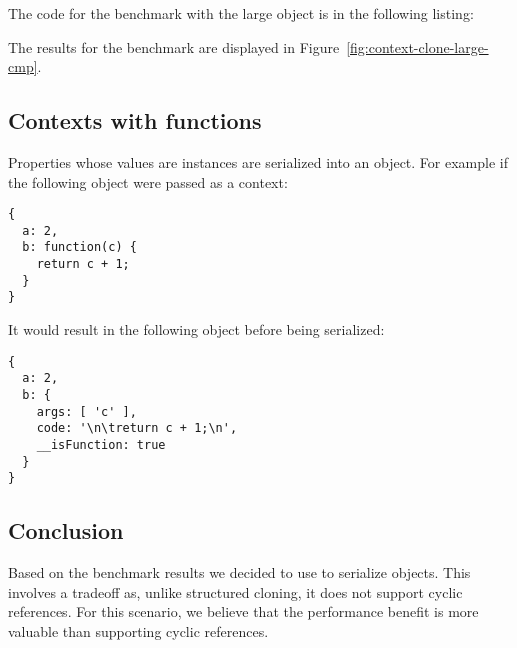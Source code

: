 The code for the benchmark with the large object is in the following listing:

The results for the benchmark are displayed in Figure~\ref{fig:context-clone-large-cmp}.

\subsection{Contexts with functions}\label{sub-sec:contexts-with-function}
Properties whose values are  instances are serialized into an object. For example if the following object were passed as a context:
\begin{lstlisting}[caption=Example context with a function property]
{
  a: 2,
  b: function(c) {
    return c + 1;
  }
}
\end{lstlisting}

It would result in the following object before being serialized:
\begin{lstlisting}[caption=Example processed context]
{
  a: 2,
  b: {
    args: [ 'c' ],
    code: '\n\treturn c + 1;\n',
    __isFunction: true
  }
}
\end{lstlisting}

\subsection{Conclusion}
Based on the benchmark results we decided to use  to serialize  objects. This involves a tradeoff as, unlike structured cloning, it does not support cyclic references. For this scenario, we believe that the performance benefit is more valuable than supporting cyclic references.

\pagebreak